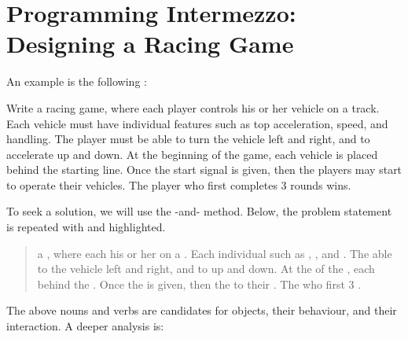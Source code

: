 \documentclass[fsharpNotes.tex]{subfiles}
\begin{document}
\section{Programming Intermezzo: Designing a Racing Game}
An example is the following :
%
\begin{task}{}
  Write a racing game, where each player controls his or her vehicle on a track. Each vehicle must have individual features such as top acceleration, speed, and handling. The player must be able to turn the vehicle left and right, and to accelerate up and down. At the beginning of the game, each vehicle is placed behind the starting line. Once the start signal is given, then the players may start to operate their vehicles. The player who first completes 3 rounds wins.
\end{task}
%
To seek a solution, we will use the -and- method. Below, the problem statement is repeated with  and  highlighted.
\begin{quote}
   a , where each   his or her  on a . Each   individual  such as , , and . The   able to  the vehicle left and right, and to  up and down. At the  of the , each   behind the . Once the  is given, then the   to  their . The  who first  3  .
\end{quote}
The above nouns and verbs are candidates for objects, their behaviour, and their interaction. A deeper analysis is:
\end{document}
